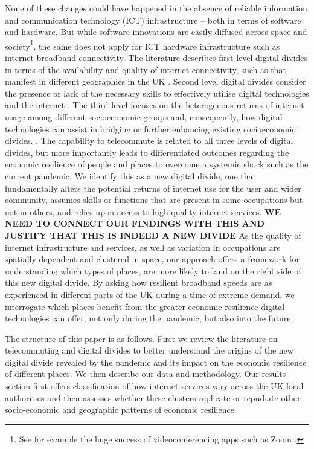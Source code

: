 \documentclass[]{interact}
\theoremstyle{plain}%
\theoremstyle{definition}
\theoremstyle{remark}
\begin{document}
None of these changes could have happened in the absence of reliable
information and communication technology (ICT) infrastructure -- both in
terms of software and hardware. But while software innovations are
easily diffused across space and society\footnote{See for example the
  huge success of videoconferencing apps such as Zoom
  \citep{marks2020zoom}.}, the same does not apply for ICT hardware
infrastructure such as internet broadband connectivity. The literature
describes first level digital divides in terms of the availability and
quality of internet connectivity, such as that manifest in different
geographies in the UK
\citep{riddlesden2014broadband, philip2017digital}. Second level digital
divides consider the presence or lack of the necessary skills to
effectively utilise digital technologies and the internet
\citep{blank2014dimensions, van2011internet}. The third level focuses on
the heterogenous returns of internet usage among different socioeconomic
groups and, consequently, how digital technologies can assist in
bridging or further enhancing existing socioeconomic divides.
\citep{stern2009levels, van2014digital, van2015third}. The capability to
telecommute is related to all three levels of digital divides, but more
importantly leads to differentiated outcomes regarding the economic
resilience of people and places to overcome a systemic shock such as the
current pandemic. We identify this as a new digital divide, one that
fundamentally alters the potential returns of internet use for the user
and wider community, assumes skills or functions that are present in
some occupations but not in others, and relies upon access to high
quality internet services. \textbf{WE NEED TO CONNECT OUR FINDINGS WITH
THIS AND JUSTIFY THAT THIS IS INDEED A NEW DIVIDE} As the quality of
internet infrastructure and services, as well as variation in
occupations are spatially dependent and clustered in space, our approach
offers a framework for understanding which types of places, are more
likely to land on the right side of this new digital divide. By asking
how resilient broadband speeds are as experienced in different parts of
the UK during a time of extreme demand, we interrogate which places
benefit from the greater economic resilience digital technologies can
offer, not only during the pandemic, but also into the future.

The structure of this paper is as follows. First we review the
literature on telecommuting and digital divides to better understand the
origins of the new digital divide revealed by the pandemic and its
impact on the economic resilience of different places. We then describe
our data and methodology. Our results section first offers
classification of how internet services vary across the UK local
authorities and then assesses whether these clusters replicate or
repudiate other socio-economic and geographic patterns of economic
resilience.
\end{document}
